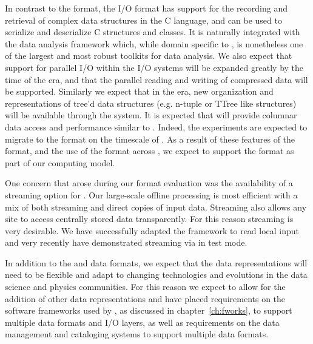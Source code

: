 \documentclass[../main-v1.tex]{subfiles}
\begin{document}
In contrast to the  format,
the  I/O format has support for the recording and retrieval of complex data structures in the  C\raisebox{1pt}{++} language, and can be used to serialize and deserialize  C\raisebox{1pt}{++} structures and classes.  It 
is naturally
integrated with the  data analysis framework which, while domain specific to , is nonetheless one of the largest and most robust toolkits for  data analysis.  We also expect that support for parallel I/O within the  I/O systems will be expanded greatly by the time of the  era, and that the parallel reading and writing of compressed data will be supported.  Similarly we expect that in the  era, new organization and representations of tree'd data structures (e.g. n-tuple or TTree like structures) will be available through the  system\cite{Blomer:2020usr, ROOTTeam:2020jal}. It is expected that  will provide columnar data access and performance similar to . Indeed, the  experiments are expected to migrate to the  format on the timescale of .
As a result of these features of the format, and the use of the format across , we expect to support the  format as part of our computing model. 

One concern that arose during our format evaluation was the availability of a streaming option for . Our large-scale offline processing is most efficient with a mix of both streaming and direct copies of input data.   Streaming also allows any  site to access centrally stored data transparently.  For this reason  streaming is very desirable.  We have successfully adapted the   framework to read  local  input and very recently have demonstrated streaming via  in test mode.  

In addition to the  and  data formats, we expect that the  data representations will need to be flexible and adapt to changing technologies and evolutions in the data science and physics communities.  For this reason we expect to allow for the addition of other data representations and have placed requirements on the software frameworks used by , as discussed in chapter~\ref{ch:fworks}, to support multiple data formats and I/O layers, as well as requirements on the data management and cataloging systems to support multiple data formats.
\end{document}
